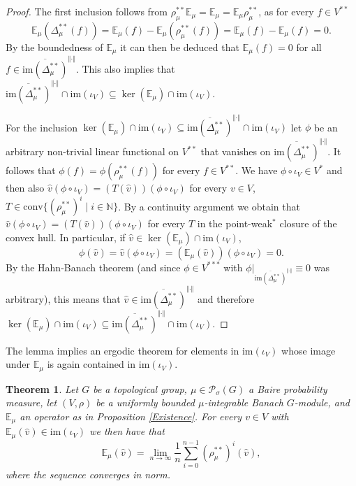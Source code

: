 \documentclass[a4paper,11pt,reqno]{amsart}
\numberwithin{equation}{section}
\newtheorem{theorem}{Theorem}[section]
\theoremstyle{definition}
\theoremstyle{remark}
\theoremstyle{remark}
\begin{document}
\begin{proof} The first inclusion follows from $\rho_{\mu}^{\ast\ast}\mathbb{E}_{\mu}=\mathbb{E}_{\mu}=\mathbb{E}_{\mu}\rho_{\mu}^{\ast\ast}$, as for every $f\in V^{\ast\ast}$ 
\[
\mathbb{E}_{\mu}(\Delta_{\mu}^{\ast\ast}(f))=\mathbb{E}_{\mu}(f)-\mathbb{E}_{\mu}(\rho_{\mu}^{\ast\ast}(f))=\mathbb{E}_{\mu}(f)-\mathbb{E}_{\mu}(f)=0.
\]
By the boundedness of $\mathbb{E}_{\mu}$ it can then be deduced that $\mathbb{E}_{\mu}(f)=0$ for all $f\in\overline{\text{im}(\Delta_{\mu}^{\ast\ast})}^{\Vert\cdot\Vert}$. This also implies that $\overline{\text{im}(\Delta_{\mu}^{\ast\ast})}^{\Vert\cdot\Vert}\cap\text{im}(\iota_{V})\subseteq\ker(\mathbb{E}_{\mu})\cap\text{im}(\iota_{V})$.

For the inclusion $\ker(\mathbb{E}_{\mu})\cap\text{im}(\iota_{V})\subseteq\overline{\text{im}(\Delta_{\mu}^{\ast\ast})}^{\Vert\cdot\Vert}\cap\text{im}(\iota_{V})$ let $\phi$ be an arbitrary non-trivial linear functional on $V^{\ast\ast}$ that vanishes on $\overline{\text{im}(\Delta_{\mu}^{\ast\ast})}^{\Vert\cdot\Vert}$. It follows that $\phi(f)=\phi(\rho_{\mu}^{\ast\ast}(f))$ for every $f\in V^{\ast\ast}$. We have $\phi\circ\iota_{V}\in V^{\ast}$ and then also $\widehat{v}(\phi\circ\iota_{V})=\left(T(\widehat{v})\right)(\phi\circ\iota_{V})$ for every $v\in V$, $T\in\text{conv}\{(\rho_{\mu}^{\ast\ast})^{i}\mid i\in\mathbb{N}\}$. By a continuity argument we obtain that $\widehat{v}(\phi\circ\iota_{V})=\left(T(\widehat{v})\right)(\phi\circ\iota_{V})$ for every $T$ in the point-weak$^{\ast}$ closure of the convex hull. In particular, if $\widehat{v}\in\ker(\mathbb{E}_{\mu})\cap\text{im}(\iota_{V})$, 
\[
\phi(\widehat{v})=\widehat{v}(\phi\circ\iota_{V})=\left(\mathbb{E}_{\mu}(\widehat{v})\right)(\phi\circ\iota_{V})=0.
\]
By the Hahn-Banach theorem (and since $\phi\in V^{\ast\ast\ast}$ with $\phi|_{\overline{\text{im}(\Delta_{\mu}^{\ast\ast})}^{\Vert\cdot\Vert}}\equiv0$ was arbitrary), this means that $\widehat{v}\in\overline{\text{im}(\Delta_{\mu}^{\ast\ast})}^{\Vert\cdot\Vert}$ and therefore $\ker(\mathbb{E}_{\mu})\cap\text{im}(\iota_{V})\subseteq\overline{\text{im}(\Delta_{\mu}^{\ast\ast})}^{\Vert\cdot\Vert}\cap\text{im}(\iota_{V})$. \end{proof}

The lemma implies an ergodic theorem for elements in $\text{im}(\iota_{V})$ whose image under $\mathbb{E}_{\mu}$ is again contained in $\text{im}(\iota_{V})$.

\begin{theorem} \label{ErgodicTheorem} Let $G$ be a topological group, $\mu\in\mathcal{P}_{\sigma}(G)$ a Baire probability measure, let $(V,\rho)$ be a uniformly bounded $\mu$-integrable Banach $G$-module, and $\mathbb{E}_{\mu}$ an operator as in Proposition \ref{Existence}. For every $v\in V$ with \emph{$\mathbb{E}_{\mu}(\widehat{v})\in\text{im}(\iota_{V})$} we then have that 
\[
\mathbb{E}_{\mu}(\widehat{v})=\lim_{n\rightarrow\infty}\frac{1}{n}\sum_{i=0}^{n-1}(\rho_{\mu}^{\ast\ast})^{i}(\widehat{v}),
\]
where the sequence converges in norm. \end{theorem}
\end{document}

